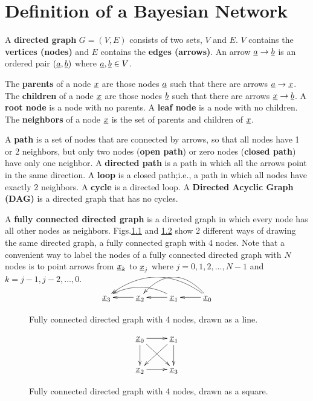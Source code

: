\chapter{Definition of a Bayesian Network}

\label{ch-bnet-def}

A {\bf directed graph} $G=(V,E)$
consists of two sets, $V$
and $E$. $V$ contains
the {\bf vertices (nodes)}
and $E$ contains the {\bf edges (arrows)}.
An arrow ${\underline{a}}\rightarrow {\underline{b}}$ is an
ordered pair
$({\underline{a}},{\underline{b}})$ where ${\underline{a}}, {\underline{b}}\in V$.

The {\bf parents}
of a node ${\underline{x}}$ are
those nodes ${\underline{a}}$
such that there are arrows
${\underline{a}}\rightarrow {\underline{x}}$.
The {\bf children} of a node
${\underline{x}}$
are those nodes ${\underline{b}}$
such that there are arrows ${\underline{x}}\rightarrow {\underline{b}}$.
A {\bf root node}
is a node with no parents.
A {\bf leaf node}
is a node with no children.
The {\bf neighbors}
of a node ${\underline{x}}$
is the set of parents and
children of ${\underline{x}}$.

A {\bf path} is a
set of nodes that
are connected
by arrows, so
that all nodes
have 1 or 2 neighbors,
but only two nodes ({\bf open path})
or zero nodes ({\bf closed path})
have only one neighbor.
A {\bf directed path}
is a path in
which all the arrows point
in the same direction.
A {\bf loop}
is a closed path;i.e.,
a path in which all
nodes have exactly 2 neighbors.
A {\bf cycle} is a directed loop.
A {\bf Directed Acyclic Graph (DAG)}
is a directed graph that has no
cycles.


A {\bf fully connected directed graph}
is
a directed graph
in which
every node has all other
nodes as neighbors.
Figs.\ref{fig-full-conn-4-line}
and
\ref{fig-full-conn-4-square}
show 2 different
ways of drawing
the same directed graph,
a fully connected graph with 4 nodes.
Note that a convenient
way
to label
the nodes of a fully
connected directed
graph
with $N$ nodes
is to point
arrows
from
${\underline{x}}_k$ to ${\underline{x}}_j$
where $j=0, 1, 2,\ldots, N-1$
and
$k=j-1, j-2, \ldots, 0$.


\begin{figure}[h!]
$$
\xymatrix{
\rvx_3
&\rvx_2\ar[l]
&\rvx_1\ar[l]\ar@/_1pc/[ll]
&\rvx_0\ar[l]\ar@/_2pc/[ll]\ar@/_2pc/[lll]
}
$$
\caption{Fully
connected directed  graph with 4 nodes,
drawn as a line.}
\label{fig-full-conn-4-line}
\end{figure}

\begin{figure}[h!]
$$
\xymatrix{
\rvx_0\ar[r]\ar[d]\ar[rd]&\rvx_1\ar[d]\ar[ld]
\\
\rvx_2\ar[r]&\rvx_3
}
$$
\caption{Fully
connected directed  graph with 4 nodes,
drawn as a square.}
\label{fig-full-conn-4-square}
\end{figure}


